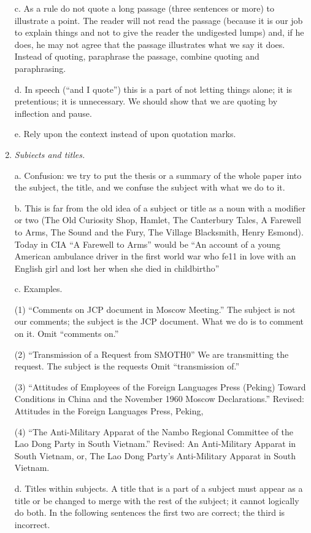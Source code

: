 \documentclass[
    oneside,
    11pt,
]{memoir}
\begin{document}
\begin{enumerate}
  c. As a rule do not quote a long passage (three sentences or more) to illustrate a point. The reader will not read the passage (because it is our job to explain things and not to give the reader the undigested lumps) and, if he does, he may not agree that the passage illustrates what we say it does. Instead of quoting, paraphrase the passage, combine quoting and paraphrasing.
  
  d. In speech (\enquote{and I quote}) this is a part of not letting things alone; it is pretentious; it is unnecessary. We should show that we are quoting by inflection and pause. 
  
  e. Rely upon the context instead of upon quotation marks.
  
  \item \emph{Subiects and titles.}
  
  a. Confusion: we try to put the thesis or a summary of the whole paper into the subject, the title, and we confuse the subject with what we do to it.
  
  b. This is far from the old idea of a subject or title as a noun with a modifier or two (The Old Curiosity Shop, Hamlet, The Canterbury Tales, A Farewell to Arms, The Sound and the Fury, The Village Blacksmith, Henry Esmond). Today in CIA \enquote{A Farewell to Arms} would be \enquote{An account of a young American ambulance driver in the first world war who fe11 in love with an English girl and lost her when she died in childbirtho} 
  
  c. Examples.
  
  (1) \enquote{Comments on JCP document in Moscow Meeting.} The subject is not our comments; the subject is the JCP document. What we do is to comment on it. Omit \enquote{comments on.} 
  
  (2) \enquote{Transmission of a Request from SMOTH0} We are transmitting the request. The subject is the requests Omit \enquote{transmission of.} 
  
  (3)  \enquote{Attitudes of Employees of the Foreign Languages Press (Peking) Toward Conditions in China and the November 1960 Moscow Declarations.} Revised: Attitudes in the Foreign Languages Press, Peking, 
  
  (4) \enquote{The Anti-Military Apparat of the Nambo Regional Committee of the Lao Dong Party in South Vietnam.} Revised: An Anti-Military Apparat in South Vietnam, or, The Lao Dong Party's Anti-Military Apparat in South Vietnam.
  
  d. Titles within subjects. A title that is a part of a subject must appear as a title or be changed to merge with the rest of the subject; it cannot logically do both. In the following sentences the first two are correct; the third is incorrect. 
  

\end{enumerate}
\end{document}
